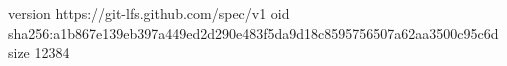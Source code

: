version https://git-lfs.github.com/spec/v1
oid sha256:a1b867e139eb397a449ed2d290e483f5da9d18c8595756507a62aa3500c95c6d
size 12384
